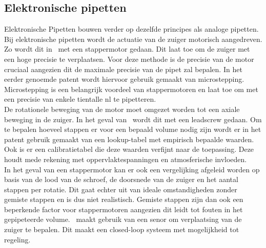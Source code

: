 \subsection{Elektronische pipetten}
Elektronische Pipetten bouwen verder op dezelfde principes als analoge pipetten. Bij elektronische pipetten wordt de actuatie van de zuiger motorisch aangedreven. Zo wordt dit in\ \cite{RN35} met een stappermotor gedaan. Dit laat toe om de zuiger met een hoge precisie te verplaatsen. Voor deze methode is de precisie van de motor cruciaal aangezien dit de maximale precisie van de pipet zal bepalen. In het eerder genoemde patent wordt hiervoor gebruik gemaakt van microstepping. Microstepping is een belangrijk voordeel van stappermotoren en laat toe om met een precisie van enkele tientalle nl te pipetteren. 
\\[12pt]De rotationele beweging van de motor moet omgezet worden tot een axiale beweging in de zuiger. In het geval van\ \cite{RN35} wordt dit met een leadscrew gedaan. Om te bepalen hoeveel stappen er voor een bepaald volume nodig zijn wordt er in het patent gebruik gemaakt van een lookup-tabel met empirisch bepaalde waarden. Ook is er een calibratietabel die deze waarden verfijnt naar de toepassing. Deze houdt mede rekening met oppervlaktespanningen en atmosferische invloeden. 
\\[12pt]In het geval van een stappermotor kan er ook een vergelijking afgeleid worden op basis van de lood van de schroef, de doorsnede van de zuiger en het aantal stappen per rotatie. Dit gaat echter uit van ideale omstandigheden zonder gemiste stappen en is dus niet realistisch. Gemiste stappen zijn dan ook een beperkende factor voor stappermotoren aangezien dit leidt tot fouten in het gepipeteerde volume.\ \cite{RN36} maakt gebruik van een senor om verplaatsing van de zuiger te bepalen. Dit maakt een closed-loop systeem met mogelijkheid tot regeling.